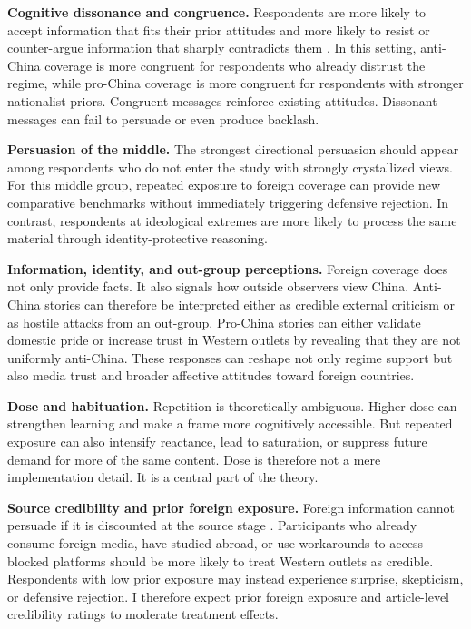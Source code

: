 \documentclass[12pt,american]{article}
\begin{document}
\textbf{Cognitive dissonance and congruence.} Respondents are more likely to accept information that fits their prior attitudes and more likely to resist or counter-argue information that sharply contradicts them \citep{taberlodge2006}. In this setting, anti-China coverage is more congruent for respondents who already distrust the regime, while pro-China coverage is more congruent for respondents with stronger nationalist priors. Congruent messages reinforce existing attitudes. Dissonant messages can fail to persuade or even produce backlash.

\textbf{Persuasion of the middle.} The strongest directional persuasion should appear among respondents who do not enter the study with strongly crystallized views. For this middle group, repeated exposure to foreign coverage can provide new comparative benchmarks without immediately triggering defensive rejection. In contrast, respondents at ideological extremes are more likely to process the same material through identity-protective reasoning.

\textbf{Information, identity, and out-group perceptions.} Foreign coverage does not only provide facts. It also signals how outside observers view China. Anti-China stories can therefore be interpreted either as credible external criticism or as hostile attacks from an out-group. Pro-China stories can either validate domestic pride or increase trust in Western outlets by revealing that they are not uniformly anti-China. These responses can reshape not only regime support but also media trust and broader affective attitudes toward foreign countries.

\textbf{Dose and habituation.} Repetition is theoretically ambiguous. Higher dose can strengthen learning and make a frame more cognitively accessible. But repeated exposure can also intensify reactance, lead to saturation, or suppress future demand for more of the same content. Dose is therefore not a mere implementation detail. It is a central part of the theory.

\textbf{Source credibility and prior foreign exposure.} Foreign information cannot persuade if it is discounted at the source stage \citep{hovlandweiss1951}. Participants who already consume foreign media, have studied abroad, or use workarounds to access blocked platforms should be more likely to treat Western outlets as credible. Respondents with low prior exposure may instead experience surprise, skepticism, or defensive rejection. I therefore expect prior foreign exposure and article-level credibility ratings to moderate treatment effects.
\end{document}
